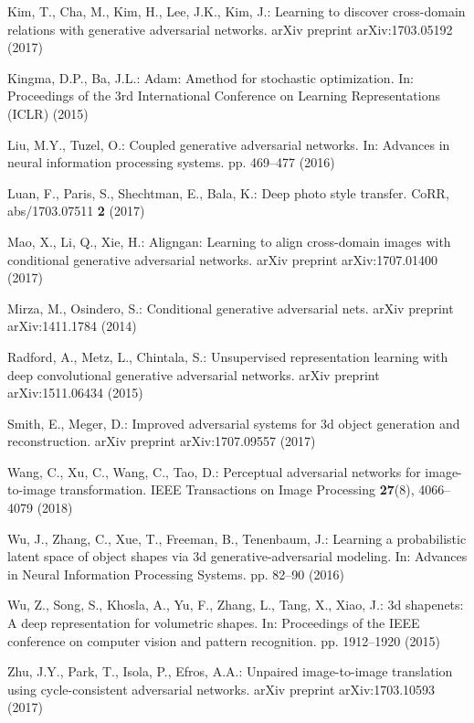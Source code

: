\documentclass[runningheads]{llncs}
\begin{document}
\begin{thebibliography}{10}
Kim, T., Cha, M., Kim, H., Lee, J.K., Kim, J.: Learning to discover
   cross-domain relations with generative adversarial networks. arXiv preprint
   arXiv:1703.05192  (2017)

Kingma, D.P., Ba, J.L.: Adam: Amethod for stochastic optimization. In:
   Proceedings of the 3rd International Conference on Learning Representations
   (ICLR) (2015)

Liu, M.Y., Tuzel, O.: Coupled generative adversarial networks. In: Advances in
   neural information processing systems. pp. 469--477 (2016)

Luan, F., Paris, S., Shechtman, E., Bala, K.: Deep photo style transfer. CoRR,
   abs/1703.07511  \textbf{2} (2017)

Mao, X., Li, Q., Xie, H.: Aligngan: Learning to align cross-domain images with
   conditional generative adversarial networks. arXiv preprint arXiv:1707.01400
   (2017)

Mirza, M., Osindero, S.: Conditional generative adversarial nets. arXiv
   preprint arXiv:1411.1784  (2014)

Radford, A., Metz, L., Chintala, S.: Unsupervised representation learning with
   deep convolutional generative adversarial networks. arXiv preprint
   arXiv:1511.06434  (2015)

Smith, E., Meger, D.: Improved adversarial systems for 3d object  
generation and
   reconstruction. arXiv preprint arXiv:1707.09557  (2017)

Wang, C., Xu, C., Wang, C., Tao, D.: Perceptual adversarial networks for
   image-to-image transformation. IEEE Transactions on Image Processing
   \textbf{27}(8),  4066--4079 (2018)

Wu, J., Zhang, C., Xue, T., Freeman, B., Tenenbaum, J.: Learning a
   probabilistic latent space of object shapes via 3d generative-adversarial
   modeling. In: Advances in Neural Information Processing Systems. pp. 82--90
   (2016)

Wu, Z., Song, S., Khosla, A., Yu, F., Zhang, L., Tang, X., Xiao, J.: 3d
   shapenets: A deep representation for volumetric shapes. In: Proceedings of
   the IEEE conference on computer vision and pattern recognition. pp.
   1912--1920 (2015)

Zhu, J.Y., Park, T., Isola, P., Efros, A.A.: Unpaired image-to-image
   translation using cycle-consistent adversarial networks. arXiv preprint arXiv:1703.10593
   (2017)

\end{thebibliography}
\end{document}
